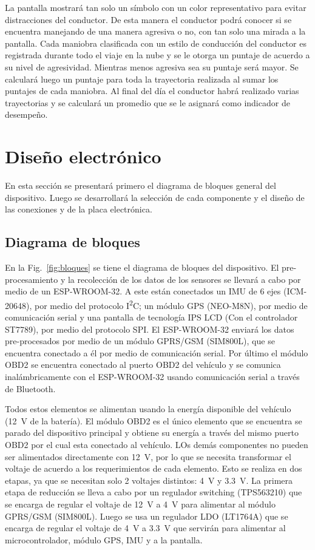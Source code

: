 La pantalla mostrará tan solo un símbolo con un color representativo para evitar distracciones del conductor. De esta manera el conductor podrá conocer si se encuentra manejando de una manera agresiva o no, con tan solo una mirada a la pantalla. Cada maniobra clasificada con un  estilo de conducción del conductor es registrada durante todo el viaje en la nube y se le otorga un puntaje de acuerdo a su nivel de agresividad. Mientras menos agresiva sea su puntaje será mayor. Se calculará luego un puntaje para toda la trayectoria realizada al sumar los puntajes de cada maniobra. Al final del día el conductor habrá realizado varias trayectorias y se calculará un promedio que se le asignará como indicador de desempeño.



\section{Diseño electrónico}
En esta sección se presentará primero el diagrama de bloques general del dispositivo. Luego se desarrollará la selección de cada componente y el diseño de las conexiones y de la placa electrónica.

\subsection{Diagrama de bloques}
En la Fig.~\ref{fig:bloques} se tiene el diagrama de bloques del dispositivo. El pre-procesamiento y la recolección de los datos de los sensores se llevará a cabo por medio de un ESP-WROOM-32. A este están conectados un IMU de 6 ejes (ICM-20648), por medio del protocolo I\textsuperscript{2}C; un módulo GPS (NEO-M8N), por medio de comunicación serial y una pantalla de tecnología IPS LCD (Con el controlador ST7789), por medio del protocolo SPI. El ESP-WROOM-32 enviará los datos pre-procesados por medio de un módulo GPRS/GSM (SIM800L), que se encuentra conectado a él por medio de comunicación serial. Por último el módulo OBD2 se encuentra conectado al puerto OBD2 del vehículo y se comunica inalámbricamente con el ESP-WROOM-32 usando comunicación serial a través de Bluetooth.

Todos estos elementos se alimentan usando la energía disponible del vehículo (\SI{12}{V} de la batería). El módulo OBD2 es el único elemento que se encuentra se parado del dispositivo principal y obtiene su energía a través del mismo puerto OBD2 por el cual esta conectado al vehículo. LOs demás componentes no pueden ser alimentados directamente con \SI{12}{V}, por lo que se necesita transformar el voltaje de acuerdo a los requerimientos de cada elemento. Esto se realiza en dos etapas, ya que se necesitan solo 2 voltajes distintos: \SI{4}{V} y \SI{3.3}{V}. La primera etapa de reducción se lleva a cabo por un regulador switching (TPS563210) que se encarga de regular el voltaje de \SI{12}{V} a \SI{4}{V} para alimentar al módulo GPRS/GSM (SIM800L). Luego se usa un regulador LDO (LT1764A) que se encarga de regular el voltaje de \SI{4}{V} a \SI{3.3}{V} que servirán para alimentar al microcontrolador, módulo GPS, IMU y a la pantalla.


